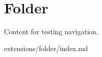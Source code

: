 
\section{\label{folder}Folder}
\par Content for testing navigation.
\par extensions/folder/index.md 